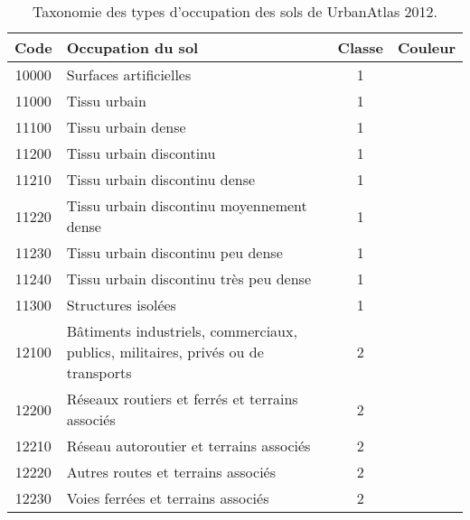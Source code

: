 \begin{table}[ht]
	\caption{Taxonomie des types d'occupation des sols de UrbanAtlas 2012.}
	\label{tab:ua2012_classes}
	\begin{tabularx}{\textwidth}{c Y c c}
		\toprule
		\textbf{Code} & \textbf{Occupation du sol} & \textbf{Classe} & \textbf{Couleur}\\
		\midrule
		10000 & Surfaces artificielles & 1 & \\
		11000 & Tissu urbain & 1 & \\
		11100 & Tissu urbain dense & 1 & \\
		11200 & Tissu urbain discontinu & 1 & \\
		11210 & Tissu urbain discontinu dense & 1 & \\
		11220 & Tissu urbain discontinu moyennement dense & 1 & \\
		11230 & Tissu urbain discontinu peu dense & 1 & \\
		11240 & Tissu urbain discontinu très peu dense & 1 & \\
		11300 & Structures isolées & 1 & \\
		12100 & Bâtiments industriels, commerciaux, publics, militaires, privés ou de transports & 2 & \\
 		12200 & Réseaux routiers et ferrés et terrains associés & 2 & \\
		12210 & Réseau autoroutier et terrains associés & 2 & \\
		12220 & Autres routes et terrains associés & 2 & \\
		12230 & Voies ferrées et terrains associés & 2 & \\

\end{tabularx}
\end{table}
